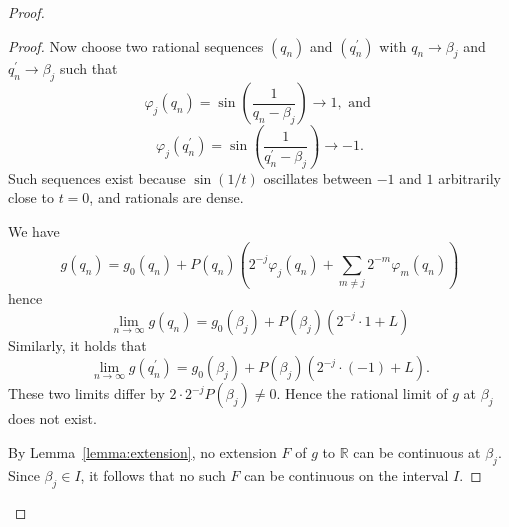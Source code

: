 \documentclass[10pt,a4paper]{amsart}
\begin{document}
\begin{proof}
\begin{proof}
Now choose two rational sequences $(q_{n})$ and $(q_{n}^{\prime})$ with $q_{n}\rightarrow\beta_{j}$ and $q_{n}^{\prime}\rightarrow\beta_{j}$ such that
\begin{equation} 
\varphi_{j}(q_{n})=\sin\left(\frac{1}{q_{n}-\beta_{j}}\right)\rightarrow1, \mbox{ and }
\end{equation} 
\begin{equation} 
\varphi_{j}(q_{n}^{\prime})=\sin\left(\frac{1}{q_{n}^{\prime}-\beta_{j}}\right)\rightarrow-1. 
\end{equation} 
Such sequences exist because $\sin(1/t)$ oscillates between $-1$ and $1$ arbitrarily close to $t=0$, and rationals are dense.

We have 
\begin{equation} 
g(q_{n})=g_{0}(q_{n})+P(q_{n})\left(2^{-j}\varphi_{j}(q_{n})+\sum_{m\ne j}2^{-m}\varphi_{m}(q_{n})\right)
\end{equation} 
hence 
\begin{equation} 
\lim_{n\rightarrow \infty} g(q_n)= g_{0}(\beta_{j})+P(\beta_{j})(2^{-j}\cdot1+L)
\end{equation} 
Similarly, it holds that 
\begin{equation} 
\lim_{n\rightarrow \infty} g(q_{n}^{\prime})= g_{0}(\beta_{j})+P(\beta_{j})(2^{-j}\cdot(-1)+L). 
\end{equation} 
These two limits differ by $2\cdot2^{-j}P(\beta_{j})\ne0$. Hence the rational limit of $g$ at $\beta_{j}$ does not exist.
 

By Lemma~\ref{lemma:extension}, no extension $F$ of $g$ to $\mathbb{R}$ can be continuous at $\beta_{j}$. Since $\beta_{j}\in I$, it follows that no such $F$ can be continuous on the interval $I$.
\end{proof}
\end{proof} 
\end{document}
